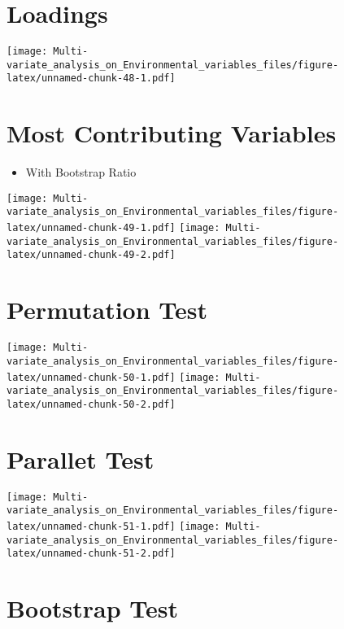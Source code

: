 \documentclass[]{book}
\providecommand{\tightlist}{%
  \setlength{\itemsep}{0pt}\setlength{\parskip}{0pt}}
\begin{document}
\hypertarget{loadings-2}{%
\section{Loadings}\label{loadings-2}}

\texttt{[image: Multi-variate\_analysis\_on\_Environmental\_variables\_files/figure-latex/unnamed-chunk-48-1.pdf]}

\hypertarget{most-contributing-variables-1}{%
\section{Most Contributing
Variables}\label{most-contributing-variables-1}}

\begin{itemize}
\tightlist
\item
  With Bootstrap Ratio
\end{itemize}

\texttt{[image: Multi-variate\_analysis\_on\_Environmental\_variables\_files/figure-latex/unnamed-chunk-49-1.pdf]}
\texttt{[image: Multi-variate\_analysis\_on\_Environmental\_variables\_files/figure-latex/unnamed-chunk-49-2.pdf]}

\hypertarget{permutation-test-2}{%
\section{Permutation Test}\label{permutation-test-2}}

\texttt{[image: Multi-variate\_analysis\_on\_Environmental\_variables\_files/figure-latex/unnamed-chunk-50-1.pdf]}
\texttt{[image: Multi-variate\_analysis\_on\_Environmental\_variables\_files/figure-latex/unnamed-chunk-50-2.pdf]}

\hypertarget{parallet-test-2}{%
\section{Parallet Test}\label{parallet-test-2}}

\texttt{[image: Multi-variate\_analysis\_on\_Environmental\_variables\_files/figure-latex/unnamed-chunk-51-1.pdf]}
\texttt{[image: Multi-variate\_analysis\_on\_Environmental\_variables\_files/figure-latex/unnamed-chunk-51-2.pdf]}

\hypertarget{bootstrap-test-2}{%
\section{Bootstrap Test}\label{bootstrap-test-2}}
\end{document}
